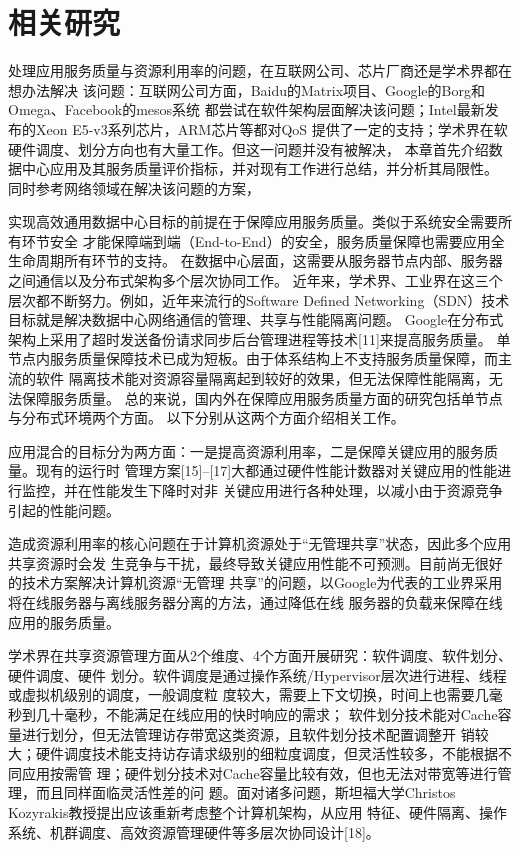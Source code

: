 

\chapter{相关研究}
\label{chap:related}

处理应用服务质量与资源利用率的问题，在互联网公司、芯片厂商还是学术界都在想办法解决
该问题：互联网公司方面，Baidu的Matrix项目、Google的Borg和Omega、Facebook的mesos系统
都尝试在软件架构层面解决该问题；Intel最新发布的Xeon E5-v3系列芯片，ARM芯片等都对QoS
提供了一定的支持；学术界在软硬件调度、划分方向也有大量工作。但这一问题并没有被解决，
本章首先介绍数据中心应用及其服务质量评价指标，并对现有工作进行总结，并分析其局限性。
同时参考网络领域在解决该问题的方案，

实现高效通用数据中心目标的前提在于保障应用服务质量。类似于系统安全需要所有环节安全
才能保障端到端（End-to-End）的安全，服务质量保障也需要应用全生命周期所有环节的支持。
在数据中心层面，这需要从服务器节点内部、服务器之间通信以及分布式架构多个层次协同工作。
近年来，学术界、工业界在这三个层次都不断努力。例如，近年来流行的Software Defined
Networking（SDN）技术\cite{SDN}目标就是解决数据中心网络通信的管理、共享与性能隔离问题。
Google在分布式架构上采用了超时发送备份请求同步后台管理进程等技术[11]来提高服务质量。
单节点内服务质量保障技术已成为短板。由于体系结构上不支持服务质量保障，而主流的软件
隔离技术能对资源容量隔离起到较好的效果，但无法保障性能隔离，无法保障服务质量。
总的来说，国内外在保障应用服务质量方面的研究包括单节点与分布式环境两个方面。
以下分别从这两个方面介绍相关工作。


应用混合的目标分为两方面：一是提高资源利用率，二是保障关键应用的服务质量。现有的运行时
管理方案[15]–[17]大都通过硬件性能计数器对关键应用的性能进行监控，并在性能发生下降时对非
关键应用进行各种处理，以减小由于资源竞争引起的性能问题。

造成资源利用率的核心问题在于计算机资源处于“无管理共享”状态，因此多个应用共享资源时会发
生竞争与干扰，最终导致关键应用性能不可预测。目前尚无很好的技术方案解决计算机资源“无管理
共享”的问题，以Google为代表的工业界采用将在线服务器与离线服务器分离的方法，通过降低在线
服务器的负载来保障在线应用的服务质量。

学术界在共享资源管理方面从2个维度、4个方面开展研究：软件调度、软件划分、硬件调度、硬件
划分。软件调度是通过操作系统/Hypervisor层次进行进程、线程或虚拟机级别的调度，一般调度粒
度较大，需要上下文切换，时间上也需要几毫秒到几十毫秒，不能满足在线应用的快时响应的需求；
软件划分技术能对Cache容量进行划分，但无法管理访存带宽这类资源，且软件划分技术配置调整开
销较大；硬件调度技术能支持访存请求级别的细粒度调度，但灵活性较多，不能根据不同应用按需管
理；硬件划分技术对Cache容量比较有效，但也无法对带宽等进行管理，而且同样面临灵活性差的问
题。面对诸多问题，斯坦福大学Christos Kozyrakis教授提出应该重新考虑整个计算机架构，从应用
特征、硬件隔离、操作系统、机群调度、高效资源管理硬件等多层次协同设计[18]。

